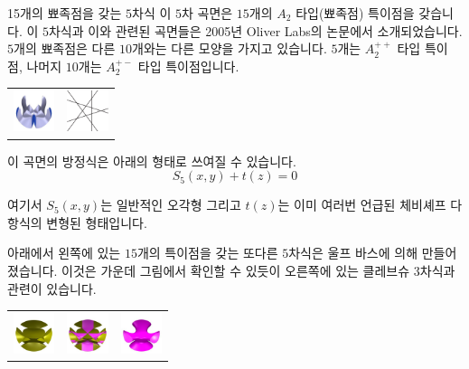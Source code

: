 \begin{surferPage}{15개의 뾰족점을 갖는 $5$차식}
이 $5$차 곡면은 $15$개의 $A_2$ 타입(뾰족점) 특이점을 갖습니다. 이 $5$차식과 이와 관련된 곡면들은 2005년 Oliver Labs의 논문에서 소개되었습니다. $5$개의 뾰족점은 다른 $10$개와는 다른 모양을 가지고 있습니다. $5$개는 $A_2^{++}$ 타입 특이점, 나머지 $10$개는 $A_2^{+-}$ 타입 특이점입니다.

     \vspace*{-0.3em}
    \begin{center}
      \begin{tabular}{c@{\qquad}c}
        \includegraphics[height=1.2cm]{./../../common/images/dessins_quint_15a2}
        &
        \includegraphics[height=1.2cm]{./../../common/images/rp5.pdf}
      \end{tabular}
    \end{center}
    \vspace*{-0.3em}    
    
    이 곡면의 방정식은 아래의 형태로 쓰여질 수 있습니다. \\
    \begin{equation*}S_5(x,y) + t(z)=0
    \end{equation*}

    여기서 $S_5(x,y)$는 일반적인 오각형 그리고 $t(z)$는 이미 여러번 언급된 체비셰프 다항식의 변형된 형태입니다. 

    아래에서 왼쪽에 있는 $15$개의 특이점을 갖는 또다른 $5$차식은 울프 바스에 의해 만들어졌습니다. 이것은 가운데 그림에서 확인할 수 있듯이 오른쪽에 있는 클레브슈 $3$차식과 관련이 있습니다. 

    \vspace*{-0.3em}
    \begin{center}
      \begin{tabular}{c@{\quad}c@{\quad}c}
        \includegraphics[height=1.2cm]{./../../common/images/barthquintic_green}
        &
        \includegraphics[height=1.2cm]{./../../common/images/barthquintic_clebschcubic}
        &
        \includegraphics[height=1.2cm]{./../../common/images/clebschcubic_pink}
      \end{tabular}
    \end{center}
\end{surferPage}

